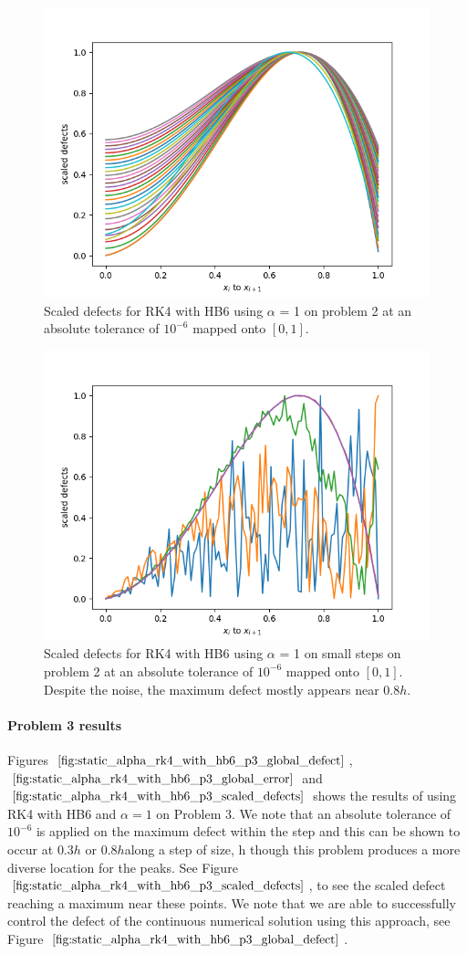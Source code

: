 \begin{figure}[H]
\centering
\includegraphics[width=0.7\linewidth]{./figures/static_alpha_rk4_with_hb6_p2_scaled_defects}
\caption{Scaled defects for RK4 with HB6 using $\alpha$ = 1 on problem 2 at an absolute tolerance of $10^{-6}$ mapped onto $[0, 1]$.}
\label{fig:static_alpha_rk4_with_hb6_p2_scaled_defects}
\end{figure}

\begin{figure}[H]
\centering
\includegraphics[width=0.7\linewidth]{./figures/static_alpha_rk4_with_hb6_p2_scaled_defects_small_steps}
\caption{Scaled defects for RK4 with HB6 using $\alpha$ = 1 on small steps on problem 2 at an absolute tolerance of $10^{-6}$ mapped onto $[0, 1]$. Despite the noise, the maximum defect mostly appears near $0.8h$.}
\label{fig:static_alpha_rk4_with_hb6_p2_scaled_defects_small_steps}
\end{figure}

\paragraph{Problem 3 results}
Figures $\ref{fig:static_alpha_rk4_with_hb6_p3_global_defect}$, $\ref{fig:static_alpha_rk4_with_hb6_p3_global_error}$ and $\ref{fig:static_alpha_rk4_with_hb6_p3_scaled_defects}$ shows the results of using RK4 with HB6 and $\alpha = 1$ on Problem 3. We note that an absolute tolerance of $10^{-6}$ is applied on the maximum defect within the step and this can be shown to occur at $0.3h$ or $0.8h$along a step of size, h though this problem produces a more diverse location for the peaks. See Figure $\ref{fig:static_alpha_rk4_with_hb6_p3_scaled_defects}$, to see the scaled defect reaching a maximum near these points. We note that we are able to successfully control the defect of the continuous numerical solution using this approach, see Figure $\ref{fig:static_alpha_rk4_with_hb6_p3_global_defect}$. 

